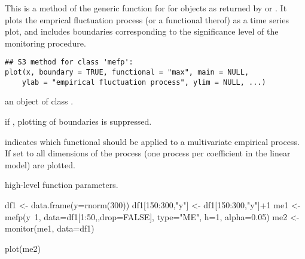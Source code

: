 \begin{Description}\relax
This is a method of the generic  function for
for  objects as returned by  or
. It plots the emprical fluctuation process (or a
functional therof) as a time series plot, and includes boundaries
corresponding to the significance level of the monitoring procedure.\end{Description}
\begin{Usage}
\begin{verbatim}
## S3 method for class 'mefp':
plot(x, boundary = TRUE, functional = "max", main = NULL,
    ylab = "empirical fluctuation process", ylim = NULL, ...)
\end{verbatim}
\end{Usage}
\begin{Arguments}
\begin{ldescription}
\item[\code{x}] an object of class .
\item[\code{boundary}] if , plotting of boundaries is suppressed.
\item[\code{functional}] indicates which functional should be applied to a
multivariate empirical process. If set to  all dimensions
of the process (one process per coefficient in the linear model) are
plotted. 
\item[\code{main, ylab, ylim, ...}] high-level  function parameters.
\end{ldescription}
\end{Arguments}
\begin{SeeAlso}\relax
{}\end{SeeAlso}
\begin{Examples}
\begin{ExampleCode}
df1 <- data.frame(y=rnorm(300))
df1[150:300,"y"] <- df1[150:300,"y"]+1
me1 <- mefp(y~1, data=df1[1:50,,drop=FALSE], type="ME", h=1,
              alpha=0.05)
me2 <- monitor(me1, data=df1)

plot(me2)
\end{ExampleCode}
\end{Examples}

